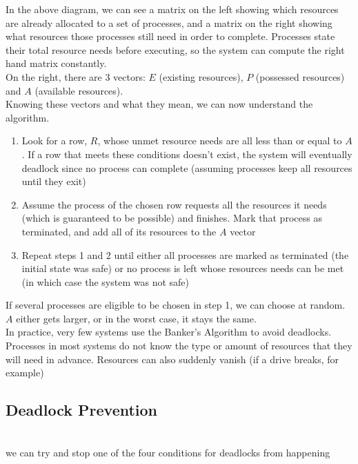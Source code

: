 \documentclass{article}
\begin{document}
In the above diagram, we can see a matrix on the left showing which resources are already allocated to a set of processes, and a matrix on the right showing what resources those processes still need in order to complete. Processes state their total resource needs before executing, so the system can compute the right hand matrix constantly.
\\On the right, there are 3 vectors: $E$ (existing resources), $P$ (possessed resources) and $A$ (available resources).
\\Knowing these vectors and what they mean, we can now understand the algorithm.
\begin{enumerate}
	\item Look for a row, $R$, whose unmet resource needs are all less than or equal to $A$. If a row that meets these conditions doesn't exist, the system will eventually deadlock since no process can complete (assuming processes keep all resources until they exit)
	\item Assume the process of the chosen row requests all the resources it needs (which is guaranteed to be possible) and finishes. Mark that process as terminated, and add all of its resources to the $A$ vector
	\item Repeat steps 1 and 2 until either all processes are marked as terminated (the initial state was safe) or no process is left whose resources needs can be met (in which case the system was not safe)
\end{enumerate}
If several processes are eligible to be chosen in step 1, we can choose at random. $A$ either gets larger, or in the worst case, it stays the same.
\\In practice, very few systems use the Banker's Algorithm to avoid deadlocks. Processes in most systems do not know the type or amount of resources that they will need in advance. Resources can also suddenly vanish (if a drive breaks, for example)
\subsection*{Deadlock Prevention} 
\\we can try and stop one of the four conditions for deadlocks from happening
\end{document}
